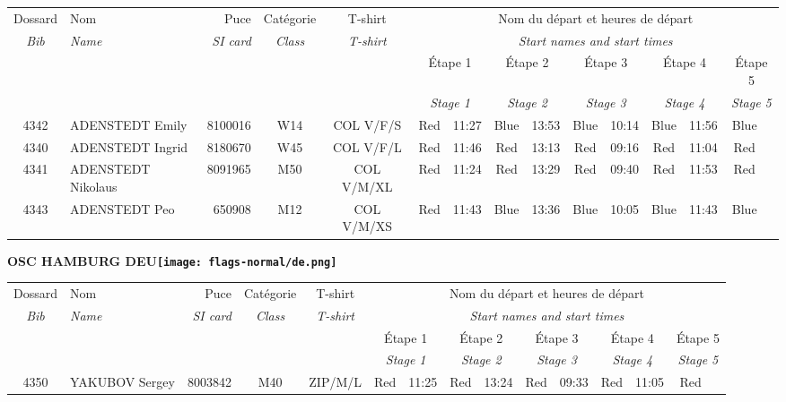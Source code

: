 \documentclass{report}
\begin{document}
  \begin{longtable}{|c|l|r|c|c|*{5}{cc|}}
    Dossard & Nom  & Puce    & Catégorie & T-shirt & \multicolumn{10}{c|}{Nom du départ et heures de départ} \\
    \itshape Bib     & \itshape Name & \itshape SI card & \itshape Class  & \itshape  T-shirt  & \multicolumn{10}{c|}{\itshape Start names and start times} \\
    \hline
    & & & & & \multicolumn{2}{c|}{Étape 1} & \multicolumn{2}{c|}{Étape 2} & \multicolumn{2}{c|}{Étape 3} & \multicolumn{2}{c|}{Étape 4} & \multicolumn{2}{c|}{Étape 5} \\
    & & & & & \multicolumn{2}{c|}{\itshape Stage 1} & \multicolumn{2}{c|}{\itshape Stage 2} & \multicolumn{2}{c|}{\itshape Stage 3} & \multicolumn{2}{c|}{\itshape Stage 4} & \multicolumn{2}{c|}{\itshape Stage 5} \\
    \hline
    4342 & ADENSTEDT Emily & 8100016 & W14 & COL V/F/S & Red & 11:27 & Blue & 13:53 & Blue & 10:14 & Blue & 11:56 & Blue &  \\
    4340 & ADENSTEDT Ingrid & 8180670 & W45 & COL V/F/L & Red & 11:46 & Red & 13:13 & Red & 09:16 & Red & 11:04 & Red &  \\
    4341 & ADENSTEDT Nikolaus & 8091965 & M50 & COL V/M/XL & Red & 11:24 & Red & 13:29 & Red & 09:40 & Red & 11:53 & Red &  \\
    4343 & ADENSTEDT Peo & 650908 & M12 & COL V/M/XS & Red & 11:43 & Blue & 13:36 & Blue & 10:05 & Blue & 11:43 & Blue &  \\
  \end{longtable}
\newpage
  \Huge \centering \bfseries OSC HAMBURG  DEU\normalfont \footnotesize \sffamily \hfill \texttt{[image: flags-normal/de.png]} \newline 
  \begin{longtable}{|c|l|r|c|c|*{5}{cc|}}
    Dossard & Nom  & Puce    & Catégorie & T-shirt & \multicolumn{10}{c|}{Nom du départ et heures de départ} \\
    \itshape Bib     & \itshape Name & \itshape SI card & \itshape Class  & \itshape  T-shirt  & \multicolumn{10}{c|}{\itshape Start names and start times} \\
    \hline
    & & & & & \multicolumn{2}{c|}{Étape 1} & \multicolumn{2}{c|}{Étape 2} & \multicolumn{2}{c|}{Étape 3} & \multicolumn{2}{c|}{Étape 4} & \multicolumn{2}{c|}{Étape 5} \\
    & & & & & \multicolumn{2}{c|}{\itshape Stage 1} & \multicolumn{2}{c|}{\itshape Stage 2} & \multicolumn{2}{c|}{\itshape Stage 3} & \multicolumn{2}{c|}{\itshape Stage 4} & \multicolumn{2}{c|}{\itshape Stage 5} \\
    \hline
    4350 & YAKUBOV Sergey & 8003842 & M40 & ZIP/M/L & Red & 11:25 & Red & 13:24 & Red & 09:33 & Red & 11:05 & Red &  \\
  \end{longtable}
\end{document}
